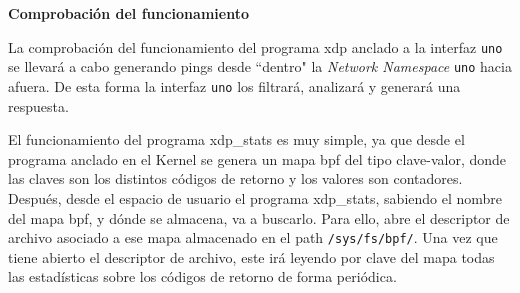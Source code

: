 \vspace{0.5cm}
\textbf{Comprobación del funcionamiento}\\
\par

La comprobación del funcionamiento del programa \gls{xdp} anclado a la interfaz \texttt{uno} se llevará a cabo generando pings desde ``dentro" la \textit{Network Namespace} \texttt{uno} hacia afuera. De esta forma la interfaz \texttt{uno} los filtrará, analizará y generará una respuesta. \\
\par
El funcionamiento del programa xdp\_stats es muy simple, ya que desde el programa anclado en el Kernel se genera un mapa \gls{bpf} del tipo clave-valor, donde las claves son los distintos códigos de retorno y los valores son contadores. Después, desde el espacio de usuario el programa xdp\_stats, sabiendo el nombre del mapa \gls{bpf}, y dónde se almacena, va a buscarlo. Para ello, abre el descriptor de archivo asociado a ese mapa almacenado en el path \texttt{/sys/fs/bpf/}. Una vez que tiene abierto el descriptor de archivo, este irá leyendo por clave del mapa todas las estadísticas sobre los códigos de retorno de forma periódica.


